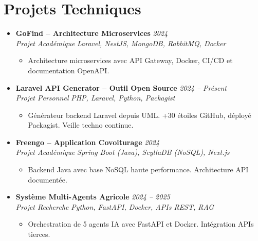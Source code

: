 \documentclass[a4paper,11pt]{article}
\begin{document}
\section{Projets Techniques}
\begin{itemize}[leftmargin=*, label={-}]

\item \textbf{GoFind -- Architecture Microservices} \hfill \textit{2024} \\
\textit{Projet Académique} \hfill \textit{Laravel, NestJS, MongoDB, RabbitMQ, Docker}
\vspace{-2pt}
    \begin{itemize}[leftmargin=0.4cm, nosep, label=\tiny$\bullet$]
        \item \small{Architecture microservices avec API Gateway, Docker, CI/CD et documentation OpenAPI.}
    \end{itemize}
\vspace{3pt}

\item \textbf{Laravel API Generator -- Outil Open Source} \hfill \textit{2024 -- Présent} \\
\textit{Projet Personnel} \hfill \textit{PHP, Laravel, Python, Packagist}
\vspace{-2pt}
    \begin{itemize}[leftmargin=0.4cm, nosep, label=\tiny$\bullet$]
        \item \small{Générateur backend Laravel depuis UML. +30 étoiles GitHub, déployé Packagist. Veille techno continue.}
    \end{itemize}
\vspace{3pt}

\item \textbf{Freengo -- Application Covoiturage} \hfill \textit{2024} \\
\textit{Projet Académique} \hfill \textit{Spring Boot (Java), ScyllaDB (NoSQL), Next.js}
\vspace{-2pt}
    \begin{itemize}[leftmargin=0.4cm, nosep, label=\tiny$\bullet$]
        \item \small{Backend Java avec base NoSQL haute performance. Architecture API documentée.}
    \end{itemize}
\vspace{3pt}

\item \textbf{Système Multi-Agents Agricole} \hfill \textit{2024 -- 2025} \\
\textit{Projet Recherche} \hfill \textit{Python, FastAPI, Docker, APIs REST, RAG}
\vspace{-2pt}
    \begin{itemize}[leftmargin=0.4cm, nosep, label=\tiny$\bullet$]
        \item \small{Orchestration de 5 agents IA avec FastAPI et Docker. Intégration APIs tierces.}
    \end{itemize}
\vspace{3pt}

\end{itemize}
\end{document}
